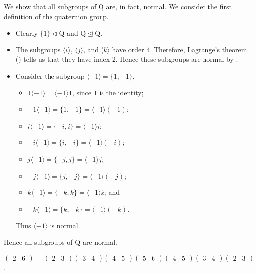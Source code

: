 \begin{questions}
    \item We show that all subgroups of $\mathrm{Q}$ are, in fact, normal. We consider the first definition of the quaternion group.
    \begin{itemize}
        \item Clearly $\{1\} \lhd \mathrm{Q}$ and $\mathrm{Q} \unlhd \mathrm{Q}$.
        \item The subgroups $\langle i\rangle$, $\langle j\rangle$, and $\langle k\rangle$ have order 4. Therefore, Lagrange's theorem () tells us that they have index 2. Hence these subgroups are normal by .
        \item Consider the subgroup $\langle -1 \rangle = \{1, -1\}$. \begin{itemize}
            \item $1\langle -1 \rangle = \langle -1 \rangle1$, since 1 is the identity;
            \item $-1\langle -1 \rangle = \{1, -1\} = \langle -1 \rangle(-1)$;
            \item $i\langle -1 \rangle = \{-i, i\} = \langle -1 \rangle i$;
            \item $-i\langle -1 \rangle = \{i, -i\} = \langle -1 \rangle (-i)$;
            \item $j\langle -1 \rangle = \{-j, j\} = \langle -1 \rangle j$;
            \item $-j\langle -1 \rangle = \{j, -j\} = \langle -1 \rangle (-j)$;
            \item $k\langle -1 \rangle = \{-k, k\} = \langle -1 \rangle k$; and
            \item $-k\langle -1 \rangle = \{k, -k\} = \langle -1 \rangle (-k)$.
        \end{itemize}
        Thus $\langle -1 \rangle$ is normal.
    \end{itemize}
    Hence all subgroups of $\mathrm{Q}$ are normal.

    \item $\begin{pmatrix}2&6\end{pmatrix} = \begin{pmatrix}2&3\end{pmatrix}\begin{pmatrix}3&4\end{pmatrix}\begin{pmatrix}4&5\end{pmatrix}\begin{pmatrix}5&6\end{pmatrix}\begin{pmatrix}4&5\end{pmatrix}\begin{pmatrix}3&4\end{pmatrix}\begin{pmatrix}2&3\end{pmatrix}$.


\end{questions}
